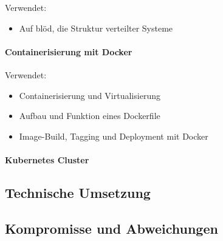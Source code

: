 Verwendet:
\begin{itemize}
  \item Auf blöd, die Struktur verteilter Systeme
\end{itemize}

\paragraph{Containerisierung mit Docker}  
Verwendet:
\begin{itemize}
  \item Containerisierung und Virtualisierung
  \item Aufbau und Funktion eines Dockerfile
  \item Image-Build, Tagging und Deployment mit Docker
\end{itemize}

\paragraph{Kubernetes Cluster}

\subsection{Technische Umsetzung}

\subsection{Kompromisse und Abweichungen}